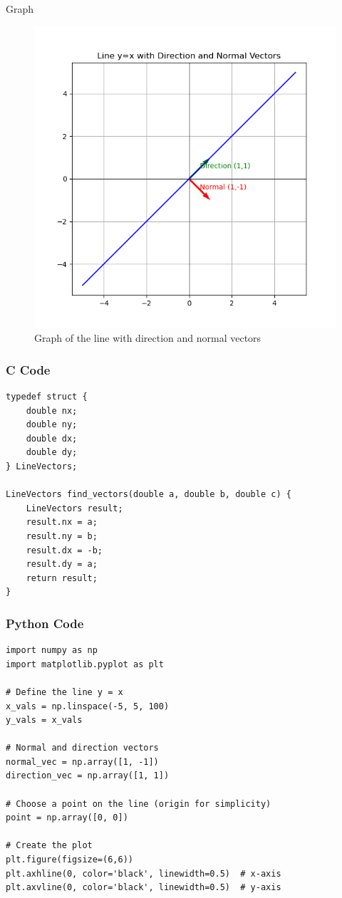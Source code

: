 \documentclass{beamer}
\begin{document}
\begin{frame}{Graph}
\begin{figure}[ht!]
\centering
\includegraphics[height=0.6\textheight, keepaspectratio]{figs/q6.png}
\caption{Graph of the line with direction and normal vectors}
\end{figure}
\end{frame}

\begin{frame}[fragile]
    \frametitle{C Code}
\begin{lstlisting}
typedef struct {
    double nx;
    double ny;
    double dx;
    double dy;
} LineVectors;

LineVectors find_vectors(double a, double b, double c) {
    LineVectors result;
    result.nx = a;
    result.ny = b;
    result.dx = -b;
    result.dy = a;
    return result;
}

\end{lstlisting}
\end{frame}

\begin{frame}[fragile]
    \frametitle{Python Code}
\begin{lstlisting}
import numpy as np
import matplotlib.pyplot as plt

# Define the line y = x
x_vals = np.linspace(-5, 5, 100)
y_vals = x_vals

# Normal and direction vectors
normal_vec = np.array([1, -1])
direction_vec = np.array([1, 1])

# Choose a point on the line (origin for simplicity)
point = np.array([0, 0])

# Create the plot
plt.figure(figsize=(6,6))
plt.axhline(0, color='black', linewidth=0.5)  # x-axis
plt.axvline(0, color='black', linewidth=0.5)  # y-axis
\end{lstlisting}
\end{frame}
\end{document}
